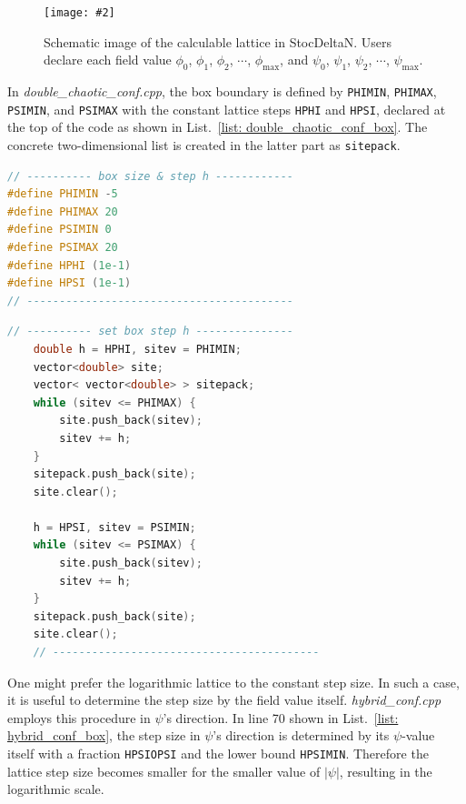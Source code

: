 \documentclass[aps, prd
, preprint
, nofootinbib 
, notitlepage
, superscriptaddress
, longbibliography
]{revtex4-1}
\newcommand{\bfe}[4]{
\begin{figure} 
	\centering
	\texttt{[image: \#2]}
	\caption{#3}
	\label{#4}
\end{figure}}
\begin{document}
\bfe{width=0.9\hsize}{figs/box.pdf}{Schematic image of the calculable lattice in StocDeltaN. Users declare each field value 
$\phi_0$, $\phi_1$, $\phi_2$, $\cdots$, $\phi_\text{max}$, and $\psi_0$, $\psi_1$, $\psi_2$, $\cdots$, $\psi_\text{max}$.}{fig: box}

In \textit{double\_chaotic\_conf.cpp}, the box boundary is defined by \texttt{PHIMIN}, \texttt{PHIMAX}, \texttt{PSIMIN}, and \texttt{PSIMAX}
with the constant lattice steps \texttt{HPHI} and \texttt{HPSI}, declared at the top of the code as shown in List.~\ref{list: double_chaotic_conf_box}.
The concrete two-dimensional list is created in the latter part as \texttt{sitepack}.

\begin{lstlisting}[language = C++, caption={\textit{sample/double\_chaotic\_conf.cpp}}, label=list: double_chaotic_conf_box, firstnumber = 6]
// ---------- box size & step h ------------
#define PHIMIN -5
#define PHIMAX 20
#define PSIMIN 0
#define PSIMAX 20
#define HPHI (1e-1)
#define HPSI (1e-1)
// -----------------------------------------
\end{lstlisting}
\begin{lstlisting}[language = C++, firstnumber = 52]
	// ---------- set box step h ---------------
	double h = HPHI, sitev = PHIMIN;
	vector<double> site;
	vector< vector<double> > sitepack;
	while (sitev <= PHIMAX) {
		site.push_back(sitev);
		sitev += h;
	}
	sitepack.push_back(site);
	site.clear();

	h = HPSI, sitev = PSIMIN;
	while (sitev <= PSIMAX) {
		site.push_back(sitev);
		sitev += h;
	}
	sitepack.push_back(site);
	site.clear();
	// -----------------------------------------
\end{lstlisting}

One might prefer the logarithmic lattice to the constant step size. In such a case, it is useful to determine the step size by the field value itself.
\textit{hybrid\_conf.cpp} employs this procedure in $\psi$'s direction.
In line 70 shown in List.~\ref{list: hybrid_conf_box}, the step size in $\psi$'s direction is determined by its $\psi$-value itself with a fraction \texttt{HPSIOPSI}
and the lower bound \texttt{HPSIMIN}. Therefore the lattice step size becomes smaller for the smaller value of $|\psi|$, resulting in the logarithmic scale.
\end{document}

